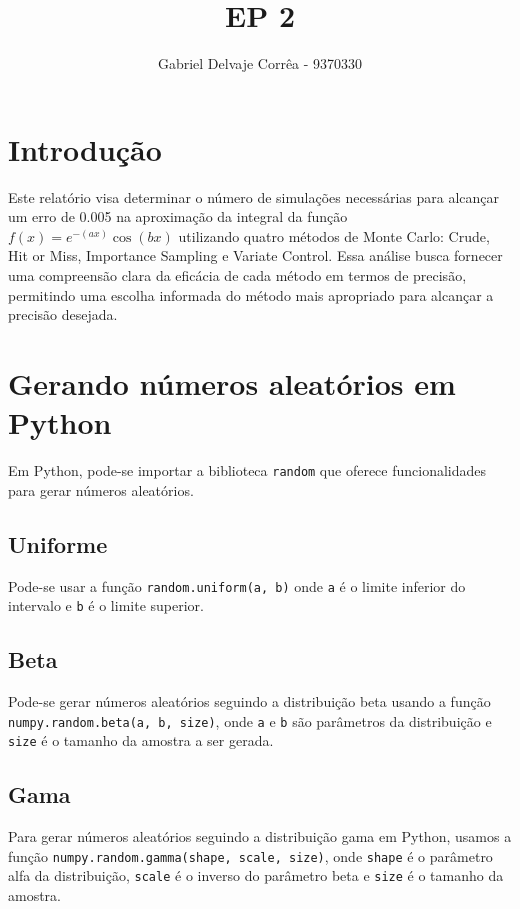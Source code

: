 \documentclass{article}
\title{EP 2}
\author{Gabriel Delvaje Corrêa - 9370330}
\begin{document}
\maketitle

\section{Introdução}

Este relatório visa determinar o número de simulações necessárias para alcançar um erro de 0.005 na aproximação da integral da função \(f(x) = e^{-(ax)} \cos(bx)\) utilizando quatro métodos de Monte Carlo: Crude, Hit or Miss, Importance Sampling e Variate Control. Essa análise busca fornecer uma compreensão clara da eficácia de cada método em termos de precisão, permitindo uma escolha informada do método mais apropriado para alcançar a precisão desejada. 

\section{Gerando números aleatórios em Python}

Em Python, pode-se importar a biblioteca \verb|random| que oferece funcionalidades para gerar números aleatórios. 

\subsection{Uniforme}

Pode-se usar a função \verb|random.uniform(a, b)| onde \verb|a| é o limite inferior do intervalo e \verb|b| é o limite superior. 

\subsection{Beta}

Pode-se gerar números aleatórios seguindo a distribuição beta usando a função \verb|numpy.random.beta(a, b, size)|, onde \verb|a| e \verb|b| são parâmetros da distribuição e \verb|size| é o tamanho da amostra a ser gerada. 

\subsection{Gama}

Para gerar números aleatórios seguindo a distribuição gama em Python, usamos a função \verb|numpy.random.gamma(shape, scale, size)|, onde \verb|shape| é o parâmetro alfa da distribuição, \verb|scale| é o inverso do parâmetro beta e \verb|size| é o tamanho da amostra.  
\end{document}

